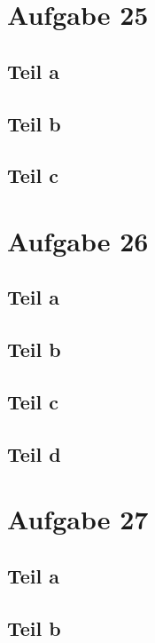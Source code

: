 \documentclass[10pt,a4paper]{article}
\begin{document}
\section{Aufgabe 25}

\subsection{Teil a}

\subsection{Teil b}

\subsection{Teil c}

\section{Aufgabe 26}

\subsection{Teil a}

\subsection{Teil b}

\subsection{Teil c}

\subsection{Teil d}

\section{Aufgabe 27}

\subsection{Teil a}

\subsection{Teil b}
\end{document}
